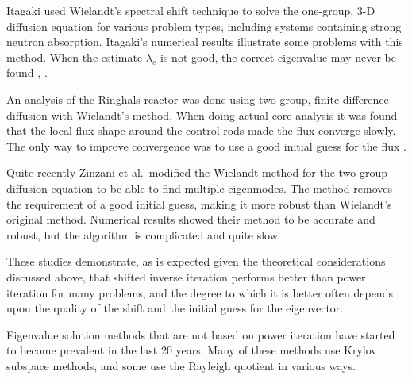 Itagaki used Wielandt's spectral shift technique to solve the one-group, 3-D diffusion equation for various problem types, including systems containing strong neutron absorption. Itagaki's numerical results illustrate some problems with this method. When the estimate $\lambda_e$ is not good, the correct eigenvalue may never be found \cite{Itagaki1996}, \cite{Itagaki2002}. 

An analysis of the Ringhals reactor was done using two-group, finite difference diffusion with Wielandt's method. When doing actual core analysis it was found that the local flux shape around the control rods made the flux converge slowly. The only way to improve convergence was to use a good initial guess for the flux \cite{Hotta1997}. 

Quite recently Zinzani et al.\ modified the Wielandt method for the two-group diffusion equation to be able to find multiple eigenmodes. The method removes the requirement of a good initial guess, making it more robust than Wielandt's original method. %
%
Numerical results showed their method to be accurate and robust, but the algorithm is complicated and quite slow \cite{Zinzani2008}.%

These studies demonstrate, as is expected given the theoretical considerations discussed above, that shifted inverse iteration performs better than power iteration for many problems, and the degree to which it is better often depends upon the quality of the shift and the initial guess for the eigenvector.

Eigenvalue solution methods that are not based on power iteration have started to become prevalent in the last 20 years. Many of these methods use Krylov subspace methods, and some use the Rayleigh quotient in various ways. 

